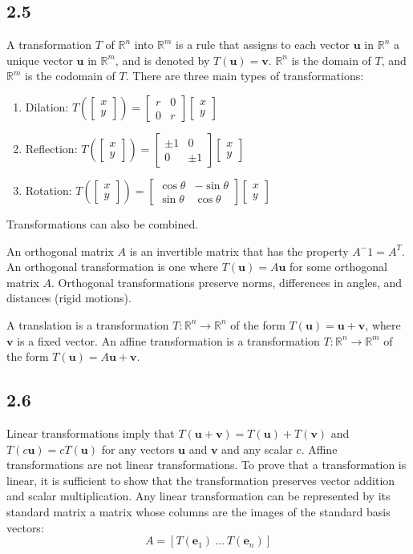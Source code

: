\documentclass{article}
\newcommand{\colvec}{\begin{bmatrix} x \\ y \end{bmatrix}}
\begin{document}
    \subsection*{2.5}
    A transformation $T$ of $\mathbb{R}^n$ into $\mathbb{R}^m$ is a rule that assigns to each vector $\mathbf{u}$ in $\mathbb{R}^n$
    a unique vector $\mathbf{u}$ in $\mathbb{R}^m$, and is denoted by $T(\mathbf{u}) = \mathbf{v}$.
    $\mathbb{R}^n$ is the domain of $T$, and $\mathbb{R}^m$ is the codomain of $T$.
    There are three main types of transformations:
    \begin{enumerate}
        \item Dilation: $T(\colvec) = \begin{bmatrix} r & 0 \\ 0 & r \end{bmatrix}\colvec$
        \item Reflection: $T(\colvec) = \begin{bmatrix} \pm1 & 0 \\ 0 & \pm1 \end{bmatrix}\colvec$
        \item Rotation: $T(\colvec) = \begin{bmatrix} \cos\theta & -\sin\theta \\ \sin\theta & \cos\theta \end{bmatrix}\colvec$
    \end{enumerate}
    Transformations can also be combined. 

    An orthogonal matrix $A$ is an invertible matrix that has the property $A^-1 = A^T$.
    An orthogonal transformation is one where $T(\mathbf{u}) = A\mathbf{u}$ for some orthogonal matrix $A$.
    Orthogonal transformations preserve norms, differences in angles, and distances (rigid motions).

    A translation is a transformation $T: \mathbb{R}^n \rightarrow \mathbb{R}^n$ of the form 
    $T(\mathbf{u}) = \mathbf{u} + \mathbf{v}$, where $\mathbf{v}$ is a fixed vector.
    An affine transformation is a transformation $T: \mathbb{R}^n \rightarrow \mathbb{R}^m$ of the form
    $T(\mathbf{u}) = A \mathbf{u} + \mathbf{v}$. 

    \subsection*{2.6}
    Linear transformations imply that $T(\mathbf{u} + \mathbf{v}) = T(\mathbf{u}) + T(\mathbf{v})$ and
    $T(c\mathbf{u}) = cT(\mathbf{u})$ for any vectors $\mathbf{u}$ and $\mathbf{v}$ and any scalar $c$.
    Affine transformations are not linear transformations.
    To prove that a transformation is linear, it is sufficient to show that the transformation preserves vector addition and scalar multiplication.
    Any linear transformation can be represented by its standard matrix
    a matrix whose columns are the images of the standard basis vectors: 
    \[A = [T(\mathbf{e}_1) \ \dots \ T(\mathbf{e}_n)]\]
    
\end{document}
